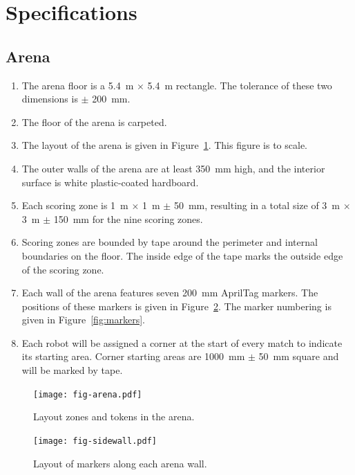 \section{Specifications}
\label{sec:specs}

\subsection{Arena}
\label{spec:arena}

\begin{enumerate}
  \item The arena floor is a \SI{5.4}{m} $\times$ \SI{5.4}{m} rectangle. The
        tolerance of these two dimensions is $\pm$ \SI{200}{mm}.
  \item The floor of the arena is carpeted.
  \item The layout of the arena is given in Figure~\ref{fig:arena}. This
        figure is to scale.
  \item The outer walls of the arena are at least \SI{350}{mm} high, and the
        interior surface is white plastic-coated hardboard.
  \item Each scoring zone is \SI{1}{m} $\times$ \SI{1}{m} $\pm$ \SI{50}{mm},
        resulting in a total size of \SI{3}{m} $\times$ \SI{3}{m} $\pm$ \SI{150}{mm}
        for the nine scoring zones.
  \item Scoring zones are bounded by tape around the perimeter
        and internal boundaries on the floor. The inside edge of the tape marks the outside
        edge of the scoring zone.
  \item Each wall of the arena features seven \SI{200}{mm} AprilTag markers.
        The positions of these markers is given in Figure~\ref{fig:sidewall}.
        The marker numbering is given in Figure~\ref{fig:markers}.
  \item Each robot will be assigned a corner at the start of every match to indicate its starting area.
        Corner starting areas are \SI{1000}{mm} $\pm$ \SI{50}{mm} square and will be marked by tape.
\end{enumerate}

\begin{figure}
  \centering
  \texttt{[image: fig-arena.pdf]}
  \caption{Layout zones and tokens in the arena.}
  \label{fig:arena}
\end{figure}


\begin{figure}
  \centering
  \texttt{[image: fig-sidewall.pdf]}
  \caption{Layout of markers along each arena wall.}
  \label{fig:sidewall}
\end{figure}


